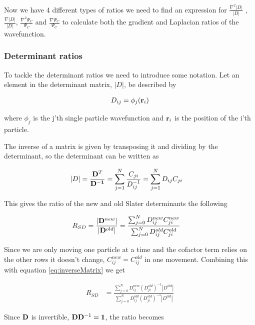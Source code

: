 \documentclass[11pt]{article}
\begin{document}
			Now we have \(4\) different types of ratios we need to find an expression for \( \frac{\nabla^2 |D|}{|D|} \) , \(\frac{\nabla |D|}{|D|} \), \( \frac{\nabla^2\Psi_C}{\Psi_C} \) and \( \frac{\nabla\Psi_C}{\Psi_C} \) to calculate both the gradient and Laplacian ratios of the wavefunction.

			\subsubsection{Determinant ratios}
			To tackle the determinant ratios we need to introduce some notation. Let an element in the determinant matrix, \(|D|\),  be described by

			\begin{align}
				D_{ij} = \phi_j(\vb{r}_i)
			\end{align}

			where \(\phi_j\) is the j'th single particle wavefunction and \( \vb{r}_i \) is the position of the i'th particle.

			The inverse of a matrix is given by transposing it and dividing by the determinant, so the determinant can be written as

			\begin{align}
				|D| &= \frac{\vb{D}^T}{\vb{D^{-1}}} = \sum_{j=1}^{N}{\frac{C_{ji}  }{ D^{-1}_{ij} } } = \sum_{j=1}^{N}{ D_{ij}C_{ji} }
				\label{eq:inverseMatrix}
			\end{align}

			This gives the ratio of the new and old Slater determinants the following

			\begin{align}
				R_{SD} &= \frac{|\vb{D}^{new}|}{|\vb{D}^{old}|} = \frac{\sum_{j=0}^N D_{ij}^{new} C_{ji}^{new} }{\sum_{j=0}^N D_{ij}^{old} C_{ji}^{old} }
			\end{align}

			Since we are only moving one particle at a time and the cofactor term relies on the other rows it doesn't change, \(C^{new}_{ij} = C^{old}_{ij}\) in one movement. Combining this with equation \eqref{eq:inverseMatrix} we get

			\begin{align}
				R_{SD} &=  \frac{\sum_{j=0}^N D_{ij}^{new} (D_{ji}^{old})^{-1} |D^{old}| }{\sum_{j=0}^N D_{ij}^{old} (D_{ji}^{old})^{-1} |D^{old}| }
			\end{align}

			Since \(\vb{D}\) is invertible, \(\vb{D}\vb{D}^{-1} = \vb{1}\), the ratio becomes
\end{document}
